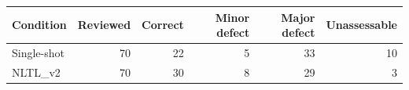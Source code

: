 \begin{tabular}{lrrrrr}
\toprule
Condition & Reviewed & Correct & Minor defect & Major defect & Unassessable \\
\midrule
Single-shot & 70 & 22 & 5 & 33 & 10 \\
NLTL\_v2 & 70 & 30 & 8 & 29 & 3 \\
\bottomrule
\end{tabular}
